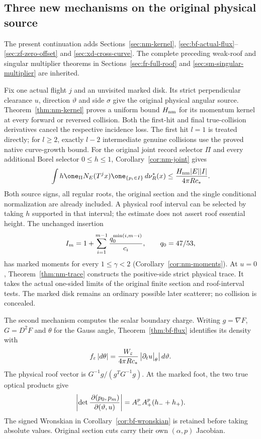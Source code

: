 \subsection*{Three new mechanisms on the original physical source}
The present continuation adds Sections~\ref{sec:nm-kernel},
\ref{sec:bf-actual-flux}--\ref{sec:zf-zero-offset} and
\ref{sec:xd-cross-curve}. The complete preceding weak-roof and singular
multiplier theorems in Sections~\ref{sec:fr-full-roof} and
\ref{sec:sm-singular-multiplier} are inherited.

Fix one actual flight $j$ and an unvisited marked disk.
Its strict perpendicular clearance $u$, direction $\vartheta$
and side $\sigma$ give the original physical angular source.
Theorem~\ref{thm:nm-kernel} proves a uniform bound $H_{\rm nm}$
for its momentum kernel at every forward or reversed collision.
Both the first-hit and final true-collision derivatives cancel the
respective incidence loss. The first hit $l=1$ is treated directly;
for $l\ge2$, exactly $l-2$ intermediate genuine collisions use the
proved native curve-growth bound. For the original joint record
selector $\Pi$ and every additional Borel selector $0\le h\le1$,
Corollary~\ref{cor:nm-joint} gives
\[
 \int h\one_\Pi N_E(T^j x)\one_{\{p_i\in I\}}\,d\nu_R^*(x)
       \le {H_{\rm nm}|E||I|\over4\pi R c_*}.
\]
Both source signs, all regular roots, the original section and the
single conditional normalization are already included.
A physical roof interval can be selected by taking $h$ supported
in that interval; the estimate does not assert roof essential height.
The unchanged insertion
\[
 I_m=1+\sum_{i=1}^{m-1}{q_0^{\min(i,m-i)}\over c_i},\qquad q_0=47/53,
\]
has marked moments for every $1\le\gamma<2$
(Corollary~\ref{cor:nm-moments}). At $u=0$,
Theorem~\ref{thm:nm-trace} constructs the positive-side strict physical
trace. It takes the actual one-sided limits of the original finite
section and roof-interval tests. The marked disk remains an ordinary
possible later scatterer; no collision is concealed.

The second mechanism computes the scalar boundary charge.
Writing $g=\nabla F$, $G=D^2F$ and $\theta$ for the Gauss angle,
Theorem~\ref{thm:bf-flux} identifies its density with
\[
 f_\varepsilon\,|d\theta|
 = {W_\varepsilon\over4\pi R c_*}
                  \left|\partial_t u\big|_\theta\right|d\vartheta .
\]
The physical roof vector is $G^{-1}g/(g^TG^{-1}g)$.
At the marked foot, the two true optical products give
\[
 \left|\det {\,\partial(p_0,p_m)\over\partial(\vartheta,u)}\right|
     = A_-^p A_+^p(h_-+h_+).
\]
The signed Wronskian in Corollary~\ref{cor:bf-wronskian} is retained
before taking absolute values. Original section cuts carry their
own $(\alpha,p)$ Jacobian.

